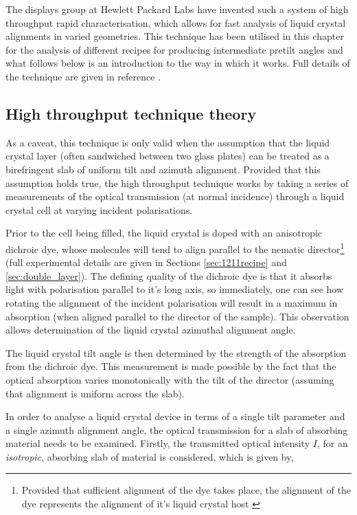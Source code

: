 The displays group at Hewlett Packard Labs have invented such a system of high throughput rapid characterisation, which allows for fast analysis of liquid crystal alignments in varied geometries. This technique has been utilised in this chapter for the analysis of different recipes for producing intermediate pretilt angles and what follows below is an introduction to the way in which it works. Full details of the technique are given in reference \cite{Edwards2010}.

\subsection{High throughput technique theory}

As a caveat, this technique is only valid when the assumption that the liquid crystal layer (often sandwiched between two glass plates) can be treated as a birefringent slab of uniform tilt and azimuth alignment. Provided that this assumption holds true, the high throughput technique works by taking a series of measurements of the optical transmission (at normal incidence) through a liquid crystal cell at varying incident polarisations.

Prior to the cell being filled, the liquid crystal is doped with an anisotropic dichroic dye, whose molecules will tend to align parallel to the nematic director\footnote{Provided that sufficient alignment of the dye takes place, the alignment of the dye represents the alignment of it's liquid crystal host \cite{Edwards2010}} (full experimental details are given in Sections \ref{sec:1211recipe} and \ref{sec:double_layer}). The defining quality of the dichroic dye is that it absorbs light with polarisation parallel to it's long axis, so immediately, one can see how rotating the alignment of the incident polarisation will result in a maximum in absorption (when aligned parallel to the director of the sample). This observation allows determination of the liquid crystal azimuthal alignment angle.

The liquid crystal tilt angle is then determined by the strength of the absorption from the dichroic dye. This measurement is made possible by the fact that the optical absorption varies monotonically with the tilt of the director (assuming that alignment is uniform across the slab). 

In order to analyse a liquid crystal device in terms of a single tilt parameter and a single azimuth alignment angle, the optical transmission for a slab of absorbing material needs to be examined. Firstly, the transmitted optical intensity $I$, for an \textit{isotropic}, absorbing slab of material is considered, which is given by,

